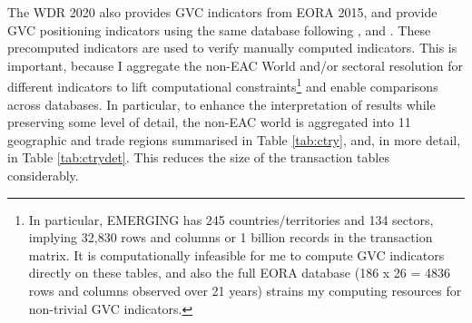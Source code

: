 \documentclass[a4paper]{article}
\begin{document}
The WDR 2020 \citep{world2020trading} also provides GVC indicators from EORA 2015, and \citet{mancini2023positioning} provide GVC positioning indicators using the same database following \citet{fally2012production}, \citet{antras2012measuring} and \citet{antras2013organizing, antras2018measurement}. These precomputed indicators are used to verify manually computed indicators. This is important, because I aggregate the non-EAC World and/or sectoral resolution for different indicators to lift computational constraints\footnote{In particular, EMERGING has 245 countries/territories and 134 sectors, implying 32,830 rows and columns or 1 billion records in the transaction matrix. It is computationally infeasible for me to compute GVC indicators directly on these tables, and also the full EORA database (186 x 26 = 4836 rows and columns observed over 21 years) strains my computing resources for non-trivial GVC indicators.} and enable comparisons across databases. In particular,
to enhance the interpretation of results while preserving some level of detail, the non-EAC world is aggregated into 11 geographic and trade regions summarised in Table \ref{tab:ctry}, and, in more detail, in Table \ref{tab:ctrydet}. This reduces the size of the transaction tables considerably. %
\end{document}
